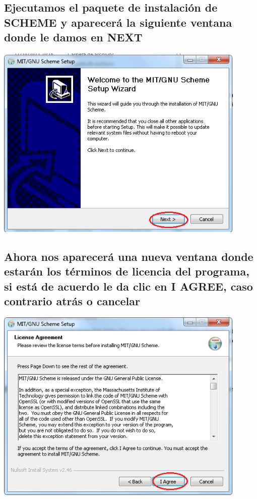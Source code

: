 \documentclass[11pt]{article} %
\begin{document}
\subsection{Ejecutamos el paquete de instalación de SCHEME y aparecerá la siguiente ventana donde le damos en NEXT}
\begin{center}
\includegraphics[width=12cm]{imagenes/2.png}
\end{center}

\subsection{Ahora nos aparecerá una nueva ventana donde estarán los términos de licencia del programa, si está de acuerdo le da clic en  I AGREE, caso contrario atrás o cancelar}
\begin{center}
\includegraphics[width=12cm]{imagenes/3.png}
\end{center}
\end{document}
